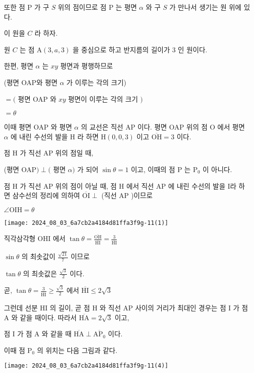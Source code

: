 \documentclass[10pt]{article}
\begin{document}
또한 점 P 가 구 \(S\) 위의 점이므로 점 P 는 평면 \(\alpha\) 와 구 \(S\) 가 만나서 생기는 원 위에 있다.

이 원을 \(C\) 라 하자.

원 \(C\) 는 점 \(\mathrm{A}(3, a, 3)\) 을 중심으로 하고 반지름의 길이가 3 인 원이다.

한편, 평면 \(\alpha\) 는 \(x y\) 평면과 평행하므로

(평면 OAP와 평면 \(\alpha\) 가 이루는 각의 크기)

\(=(\) 평면 OAP 와 \(x y\) 평면이 이루는 각의 크기 \()\)

\(=\theta\)

이때 평면 OAP 와 평면 \(\alpha\) 의 교선은 직선 AP 이다. 평면 OAP 위의 점 O 에서 평면 \(\alpha\) 에 내린 수선의 발을 H 라 하면 \(\mathrm{H}(0,0,3)\) 이고 \(\overline{\mathrm{OH}}=3\) 이다.

점 H 가 직선 AP 위의 점일 때,

(평면 OAP\() \perp(\) 평면 \(\alpha)\) 가 되어 \(\sin \theta=1\) 이고, 이때의 점 P 는 \(\mathrm{P}_{0}\) 이 아니다.

점 H 가 직선 AP 위의 점이 아닐 때, 점 H 에서 직선 AP 에 내린 수선의 발을 I라 하면 삼수선의 정리에 의하여 \(\overline{\mathrm{OI}} \perp\) (직선 AP )이므로

\(\angle \mathrm{OIH}=\theta\)

\begin{center}
\texttt{[image: 2024\_08\_03\_6a7cb2a4184d81ffa3f9g-11(1)]}
\end{center}

직각삼각형 OHI 에서 \(\tan \theta=\frac{\overline{\mathrm{OH}}}{\overline{\mathrm{HI}}}=\frac{3}{\overline{\mathrm{HI}}}\)

\(\sin \theta\) 의 최솟값이 \(\frac{\sqrt{21}}{7}\) 이므로

\(\tan \theta\) 의 최솟값은 \(\frac{\sqrt{3}}{2}\) 이다.

곧, \(\tan \theta=\frac{3}{\overline{\mathrm{HI}}} \geq \frac{\sqrt{3}}{2}\) 에서 \(\overline{\mathrm{HI}} \leq 2 \sqrt{3}\)

그런데 선분 HI 의 길이, 곧 점 H 와 직선 AP 사이의 거리가 최대인 경우는 점 I 가 점 A 와 같을 때이다. 따라서 \(\overline{\mathrm{HA}}=2 \sqrt{3}\) 이고,

점 I 가 점 A 와 같을 때 \(\overline{\mathrm{HA}} \perp \overline{\mathrm{AP}_{0}}\) 이다.

이때 점 \(\mathrm{P}_{0}\) 의 위치는 다음 그림과 같다.

\begin{center}
\texttt{[image: 2024\_08\_03\_6a7cb2a4184d81ffa3f9g-11(4)]}
\end{center}
\end{document}
